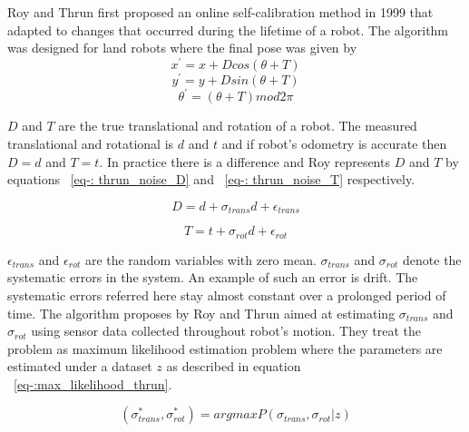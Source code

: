 \documentclass[12pt]{dalcsthesis}
\begin{document}
Roy and Thrun first proposed an online self-calibration method \cite{Roy} in 1999 that adapted to changes that occurred during the lifetime of a robot. The algorithm was designed for land robots where the final pose was given by
\begin{equation}
x^{'}=x+Dcos(\theta+T)
\end{equation}
\begin{equation}
y^{'}=y+Dsin(\theta+T)
\end{equation}
\begin{equation}
\theta^{'}=(\theta+T)mod2\pi
\end{equation}

$D$ and $T$ are the true translational and rotation of a robot. The measured translational and rotational is $d$ and $t$ and if robot's odometry is accurate then $D=d$ and $T=t$. In practice there is a difference and Roy represents $D$ and $T$ by equations ~\ref{eq-: thrun_noise_D} and ~\ref{eq-: thrun_noise_T} respectively.

\begin{equation}
\label{eq-: thrun_noise_D}
D= d+ \sigma_{trans}d+\epsilon_{trans}
\end{equation}

\begin{equation}
\label{eq-: thrun_noise_T}
  T= t+ \sigma_{rot}d+\epsilon_{rot}
\end{equation}

$\epsilon_{trans}$ and $\epsilon_{rot}$ are the random variables with zero mean. $\sigma_{trans}$ and $\sigma_{rot}$ denote the systematic errors in the system. An example of such an error is drift. The systematic errors referred here stay almost constant over a prolonged period of time. The algorithm proposes by Roy and Thrun aimed at  estimating $\sigma_{trans}$ and $\sigma_{rot}$ using sensor data collected throughout robot's motion. They treat the problem as maximum likelihood estimation problem where the parameters are estimated under a dataset $z$ as described in equation ~\ref{eq-:max_likelihood_thrun}.

\begin{equation}
\label{eq-:max_likelihood_thrun}
 (\sigma_{trans}^{*},\sigma_{rot}^{*}) = argmax P(\sigma_{trans},\sigma_{rot}|z)
\end{equation}
\end{document}
